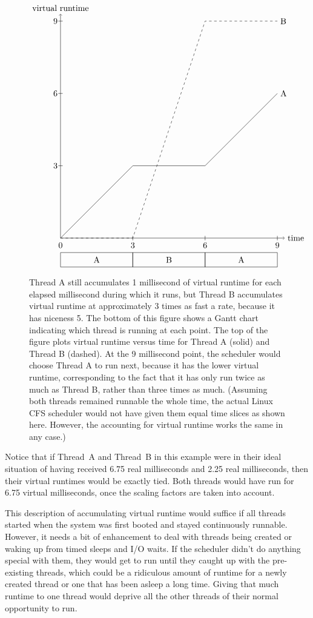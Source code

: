 \begin{figure}
\[\begin{tikzpicture}[scale=.03]
\draw (0,0) rectangle (100,20);
\draw (100,0) rectangle (200,20);
\draw (200,0) rectangle (300,20);
\draw (50,10) node{A};
\draw (150,10) node{B};
\draw (250,10) node{A};
\draw (0,30) node{0};
\draw (100,30) node{3};
\draw (100,37) -- (100,43);
\draw (200,30) node{6};
\draw (200,37) -- (200,43);
\draw (300,30) node{9};
\draw (300,37) -- (300,43);
\draw[->] (0,40) -- (310,40) node[right] {time};
\draw[->] (0,40) -- (0,350) node[above] {virtual runtime};
\draw (0,40) -- (100,140) -- (200,140) -- (300, 240) node[right] {A};
\draw[dashed] (0,40) -- (100,40) -- (200,340) -- (300, 340) node[right] {B};
\draw (-7,140) node{3};
\draw (-3,140) -- (3,140);
\draw (-7,240) node{6};
\draw (-3,240) -- (3,240);
\draw (-7,340) node{9};
\draw (-3,340) -- (3,340);
\end{tikzpicture}\]
\caption{Thread A still accumulates 1 millisecond of virtual
runtime for each elapsed millisecond during which it runs, but Thread B accumulates virtual
runtime at approximately 3 times as fast a rate, because it has niceness 5.  The bottom of this figure shows a Gantt
chart indicating which thread is running at each point.  The top of the figure plots virtual runtime versus time
for Thread A (solid) and Thread B (dashed). At the 9 millisecond point, the scheduler would choose
Thread A to run next, because it has the lower virtual runtime, corresponding to the fact that it has
only run twice as much as Thread B, rather than three times as much.
(Assuming both threads remained runnable the whole time, the actual Linux CFS scheduler
would not have given them equal time slices as shown here.  However, the accounting for
virtual runtime works the same in any case.)}\label{proportional-virtual-runtime-figure}
\end{figure}

Notice that if Thread~A and Thread~B in this example were in their ideal
situation of having received 6.75 real milliseconds and 2.25 real milliseconds,
then their virtual runtimes would be exactly tied.  Both threads would
have run for 6.75 virtual milliseconds, once the scaling factors are taken into account.

This description of accumulating virtual runtime would suffice if all
threads started when the system was first booted and stayed
continuously runnable.  However, it needs a bit of
enhancement to deal with threads being created or waking up from timed sleeps and I/O waits.
If the scheduler didn't do anything special with them, they would get
to run until they caught up with the pre-existing threads, which could
be a ridiculous amount of runtime for a newly created thread or one that
has been asleep a long time.  Giving that much runtime to one thread would
deprive all the other threads of their normal opportunity to run.


